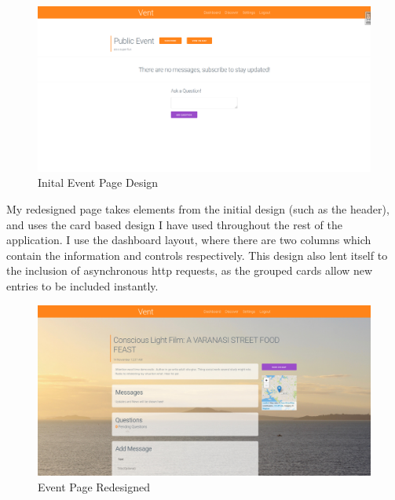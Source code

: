 \documentclass[a4paper,oneside,12pt]{report}
\begin{document}
	\begin{figure}[H]
		\caption{Inital Event Page Design}
		\includegraphics[width=\linewidth]{static/front-end6.png}
	\end{figure}
	
	My redesigned page takes elements from the initial design (such as the header), and uses the card based design I have used throughout the rest of the application. I use the dashboard layout, where there are two columns which contain the information and controls respectively. This design also lent itself to the inclusion of asynchronous http requests, as the grouped cards allow new entries to be included instantly.
	
	\begin{figure}[H]
		\caption{Event Page Redesigned}
		\includegraphics[width=\linewidth]{static/front-end7.jpg}
	\end{figure}
\end{document}
